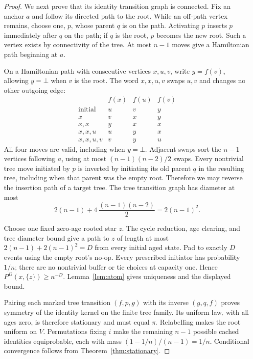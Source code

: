 \documentclass[11pt]{article}
\begin{document}
\begin{proof}
We next prove that its identity transition graph is connected.
Fix an anchor $a$ and follow its directed path to the root.
While an off-path vertex remains, choose one, $p$, whose parent
$q$ is on the path. Activating $p$ inserts $p$ immediately after
$q$ on the path; if $q$ is the root, $p$ becomes the new root.
Such a vertex exists by connectivity of the tree.
At most $n-1$ moves give a Hamiltonian path beginning at $a$.

On a Hamiltonian path with consecutive vertices $x,u,v$, write
$y=f(v)$, allowing $y=\bot$ when $v$ is the root.
The word $x,x,u,v$ swaps $u,v$ and changes no other outgoing edge:
\[
\begin{array}{c|ccc}
 &f(x)&f(u)&f(v)\\ \hline
 \text{initial}&u&v&y\\
 x&v&x&y\\
 x,x&y&x&x\\
 x,x,u&u&y&x\\
 x,x,u,v&v&y&u
\end{array}
\]
All four moves are valid, including when $y=\bot$.
Adjacent swaps sort the $n-1$ vertices following $a$, using at most
$(n-1)(n-2)/2$ swaps.
Every nontrivial tree move initiated by $p$ is inverted by
initiating its old parent $q$ in the resulting tree, including
when that parent was the empty root. Therefore we may reverse
the insertion path of a target tree. The tree transition graph
has diameter at most
\[
 2(n-1)+4\,\frac{(n-1)(n-2)}2=2(n-1)^2.
\]

Choose one fixed zero-age rooted star $z$.
The cycle reduction, age clearing, and tree diameter bound give
a path to $z$ of length at most
$2(n-1)+2(n-1)^2=D$ from every initial aged state.
Pad to exactly $D$ events using the empty root's no-op.
Every prescribed initiator has probability $1/n$; there are no
nontrivial buffer or tie choices at capacity one. Hence
$P^D(x,\{z\})\ge n^{-D}$.
Lemma~\ref{lem:atom} gives uniqueness and the displayed bound.

Pairing each marked tree transition $(f,p,g)$ with its inverse
$(g,q,f)$ proves symmetry of the identity kernel on the finite
tree family. Its uniform law, with all ages zero, is therefore
stationary and must equal $\pi$. Relabelling makes the root
uniform on $V$. Permutations fixing $i$ make the remaining
$n-1$ possible cached identities equiprobable, each with mass
$(1-1/n)/(n-1)=1/n$. Conditional convergence follows from
Theorem~\ref{thm:stationary}.
\end{proof}
\end{document}
